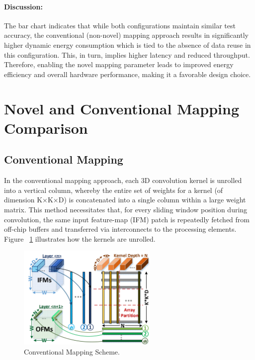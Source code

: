 \documentclass[11pt]{article}
\begin{document}
\paragraph{Discussion:}
The bar chart indicates that while both configurations maintain similar test accuracy, the conventional (non-novel) mapping approach results in significantly higher dynamic energy consumption which is tied to the absence of data reuse in this configuration. This, in turn, implies higher latency and reduced throughput. Therefore, enabling the novel mapping parameter leads to improved energy efficiency and overall hardware performance, making it a favorable design choice.

\section{Novel and Conventional Mapping Comparison}
\subsection{Conventional Mapping}
In the conventional mapping approach, each 3D convolution kernel is unrolled into a vertical column, whereby the entire set of weights for a kernel (of dimension K×K×D) is concatenated into a single column within a large weight matrix. This method necessitates that, for every sliding window position during convolution, the same input feature-map (IFM) patch is repeatedly fetched from off-chip buffers and transferred via interconnects to the processing elements. Figure ~\ref{fig:conv_mapping} illustrates how the kernels are unrolled.
\begin{figure}[H]
  \centering
  \includegraphics[width=0.6\textwidth]{asset/conv_map.png} %
  \caption{Conventional Mapping Scheme.}
  \label{fig:conv_mapping}
\end{figure}
\end{document}
